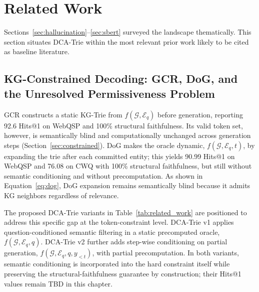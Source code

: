 \section{Related Work}
\label{sec:related}

Sections~\ref{sec:hallucination}--\ref{sec:sbert} surveyed the landscape thematically. This section situates DCA-Trie within the most relevant prior work likely to be cited as baseline literature.

\subsection{KG-Constrained Decoding: GCR, DoG, and the Unresolved Permissiveness Problem}

GCR \citep{luo2024gcr} constructs a static KG-Trie from
$f(\mathcal{G}, \mathcal{E}_q)$ before generation, reporting 92.6 Hits@1 on
WebQSP and 100\% structural faithfulness. Its valid token set, however, is
semantically blind and computationally unchanged across generation steps
(Section~\ref{sec:constrained}). DoG \citep{li2024dog} makes the oracle dynamic,
$f(\mathcal{G}, \mathcal{E}_q, t)$, by expanding the trie after each committed
entity; this yields 90.99 Hits@1 on WebQSP and 76.08 on CWQ with 100\%
structural faithfulness, but still without semantic conditioning and without
precomputation. As shown in Equation~\eqref{eq:dog}, DoG expansion remains
semantically blind because it admits KG neighbors regardless of relevance.

The proposed DCA-Trie variants in Table~\ref{tab:related_work} are positioned
to address this specific gap at the token-constraint level. DCA-Trie v1 applies
question-conditioned semantic filtering in a static precomputed oracle,
$f(\mathcal{G}, \mathcal{E}_q, q)$. DCA-Trie v2 further adds step-wise
conditioning on partial generation,
$f(\mathcal{G}, \mathcal{E}_q, q, y_{<t})$, with partial precomputation. In
both variants, semantic conditioning is incorporated into the hard constraint
itself while preserving the structural-faithfulness guarantee by construction;
their Hits@1 values remain TBD in this chapter.


